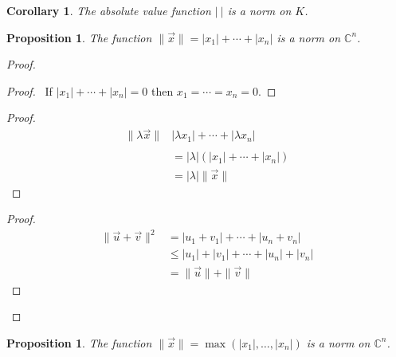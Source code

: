 \documentclass{book}
\let\qed\relax
\newtheorem{prop}[ax]{Proposition}
\newtheorem{cor}{Corollary}[ax]
\theoremstyle{definition}
\begin{document}
\begin{cor}
The absolute value function $|\ |$ is a norm on $K$.
\end{cor}

\begin{prop}
The function $\| \vec{x} \| = |x_1| + \cdots + |x_n|$ is a norm on $\mathbb{C}^n$.
\end{prop}

\begin{proof}
\pf
{}
\begin{proof}
	\pf\ If $|x_1| + \cdots + |x_n| = 0$ then $x_1 = \cdots = x_n = 0$.
\end{proof}
\begin{proof}
	\pf
	\begin{align*}
		\| \lambda \vec{x} \| & |\lambda x_1| + \cdots + |\lambda x_n| \\\\
		& = |\lambda| (|x_1| + \cdots + |x_n|) \\
		& = |\lambda| \|\vec{x}\|
	\end{align*}
\end{proof}
\begin{proof}
	\pf
	\begin{align*}
		\|\vec{u} + \vec{v}\|^2 & = |u_1 + v_1| + \cdots + |u_n + v_n| \\
		& \leq |u_1| + |v_1| + \cdots + |u_n| + |v_n| \\
		& = \|\vec{u}\| + \|\vec{v}\|
	\end{align*}
\end{proof}
\qed
\end{proof}

\begin{prop}
The function $\|\vec{x}\| = \max(|x_1|, \ldots, |x_n|)$ is a norm on $\mathbb{C}^n$.
\end{prop}
\end{document}
